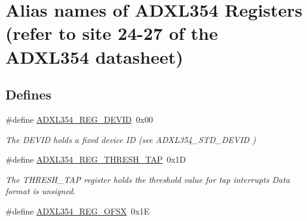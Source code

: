 \hypertarget{group___a_d_x_l354___r_e_g_i_s_t_e_r_s}{\section{\-Alias names of \-A\-D\-X\-L354 \-Registers (refer to site 24-\/27 of the \-A\-D\-X\-L354 datasheet)}
\label{group___a_d_x_l354___r_e_g_i_s_t_e_r_s}
}
\subsection*{\-Defines}
\begin{DoxyCompactItemize}
\item 
\hypertarget{group___a_d_x_l354___r_e_g_i_s_t_e_r_s_ga0502be9729f2c6d3bbe5a82ce2d773e3}{\#define \hyperlink{group___a_d_x_l354___r_e_g_i_s_t_e_r_s_ga0502be9729f2c6d3bbe5a82ce2d773e3}{\-A\-D\-X\-L354\-\_\-\-R\-E\-G\-\_\-\-D\-E\-V\-I\-D}~0x00}\label{group___a_d_x_l354___r_e_g_i_s_t_e_r_s_ga0502be9729f2c6d3bbe5a82ce2d773e3}

\begin{DoxyCompactList}\small\item\em \-The \-D\-E\-V\-I\-D holds a fixed device \-I\-D (see \-A\-D\-X\-L354\-\_\-\-S\-T\-D\-\_\-\-D\-E\-V\-I\-D ) \end{DoxyCompactList}\item 
\hypertarget{group___a_d_x_l354___r_e_g_i_s_t_e_r_s_ga7e0efa725edb4701c8d7e93e52e5e483}{\#define \hyperlink{group___a_d_x_l354___r_e_g_i_s_t_e_r_s_ga7e0efa725edb4701c8d7e93e52e5e483}{\-A\-D\-X\-L354\-\_\-\-R\-E\-G\-\_\-\-T\-H\-R\-E\-S\-H\-\_\-\-T\-A\-P}~0x1\-D}\label{group___a_d_x_l354___r_e_g_i_s_t_e_r_s_ga7e0efa725edb4701c8d7e93e52e5e483}

\begin{DoxyCompactList}\small\item\em \-The \-T\-H\-R\-E\-S\-H\-\_\-\-T\-A\-P register holds the threshold value for tap interrupts \-Data format is unsigned. \end{DoxyCompactList}\item 
\hypertarget{group___a_d_x_l354___r_e_g_i_s_t_e_r_s_gac9c88162d0a35fc24357d41632871f89}{\#define \hyperlink{group___a_d_x_l354___r_e_g_i_s_t_e_r_s_gac9c88162d0a35fc24357d41632871f89}{\-A\-D\-X\-L354\-\_\-\-R\-E\-G\-\_\-\-O\-F\-S\-X}~0x1\-E}\label{group___a_d_x_l354___r_e_g_i_s_t_e_r_s_gac9c88162d0a35fc24357d41632871f89}


\end{DoxyCompactItemize}
